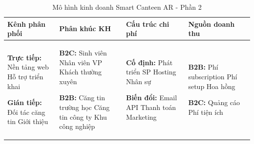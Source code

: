 \documentclass[12pt,a4paper]{article}
\begin{document}
\begin{table}[H]
\centering
\caption{Mô hình kinh doanh Smart Canteen AR - Phần 2}
\label{tab:lean-canvas-2}
\begin{tabular}{|p{3cm}|p{3cm}|p{3cm}|p{3cm}|}
\hline
\textbf{Kênh phân phối} & \textbf{Phân khúc KH} & \textbf{Cấu trúc chi phí} & \textbf{Nguồn doanh thu} \\
\hline
\textbf{Trực tiếp:}
\newline \textbullet{} Nền tảng web
\newline \textbullet{} Hỗ trợ triển khai

\textbf{Gián tiếp:}
\newline \textbullet{} Đối tác căng tin
\newline \textbullet{} Giới thiệu &

\textbf{B2C:}
\newline \textbullet{} Sinh viên
\newline \textbullet{} Nhân viên VP
\newline \textbullet{} Khách thường xuyên

\textbf{B2B:}
\newline \textbullet{} Căng tin trường học
\newline \textbullet{} Căng tin công ty
\newline \textbullet{} Khu công nghiệp &

\textbf{Cố định:}
\newline \textbullet{} Phát triển SP
\newline \textbullet{} Hosting
\newline \textbullet{} Nhân sự

\textbf{Biến đổi:}
\newline \textbullet{} Email API
\newline \textbullet{} Thanh toán
\newline \textbullet{} Marketing &

\textbf{B2B:}
\newline \textbullet{} Phí subscription
\newline \textbullet{} Phí setup
\newline \textbullet{} Hoa hồng

\textbf{B2C:}
\newline \textbullet{} Quảng cáo
\newline \textbullet{} Phí tiện ích \\
\hline
\end{tabular}
\end{table}
\end{document}
